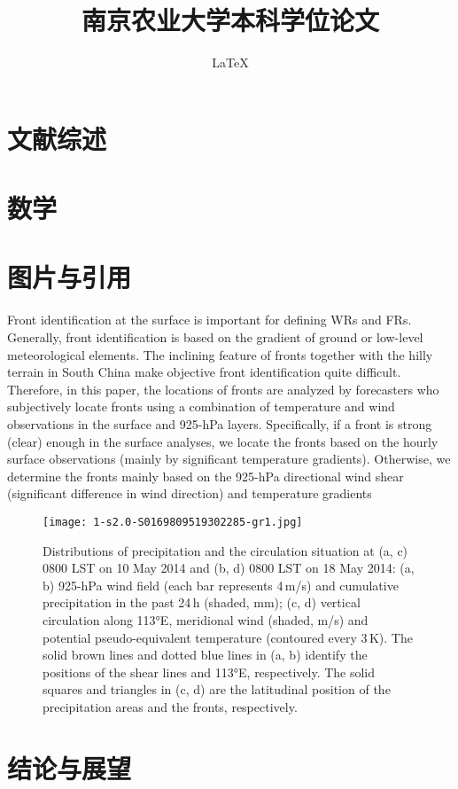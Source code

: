 \documentclass{thesis}
\title{南京农业大学本科学位论文}
{ \LaTeX 模板示例文档}{A Sample Document for \LaTeX-based NJAU Thesis Template}
\author{ \LaTeX }
\begin{document}
\makecover

\copyrightpage



\tableofcontents

\mainpart

\section{文献综述}


\section{数学}


\section{图片与引用}
Front identification at the surface is important for defining WRs and
FRs. Generally, front identification is based on the gradient of ground or
low-level meteorological elements. The inclining feature of fronts together with the hilly terrain in South China make objective front
identification quite difficult. Therefore, in this paper, the locations of
fronts are analyzed by forecasters who subjectively locate fronts using a
combination of temperature and wind observations in the surface and
925-hPa layers. Specifically, if a front is strong (clear) enough in the
surface analyses, we locate the fronts based on the hourly surface observations (mainly by significant temperature gradients). Otherwise, we
determine the fronts mainly based on the 925-hPa directional wind
shear (significant difference in wind direction) and temperature gradients\cite{WU2020104693}
\begin{figure}[htbp]
	\centering
	\texttt{[image: 1-s2.0-S0169809519302285-gr1.jpg]}
	\caption{Distributions of precipitation and the circulation situation at (a, c) 0800 LST on 10 May 2014 and (b, d) 0800 LST on 18 May 2014: (a, b) 925-hPa wind field (each bar represents 4 m/s) and cumulative precipitation in the past 24 h (shaded, mm); (c, d) vertical circulation along 113°E, meridional wind (shaded, m/s) and potential pseudo-equivalent temperature (contoured every 3 K). The solid brown lines and dotted blue lines in (a, b) identify the positions of the shear lines and 113°E, respectively. The solid squares and triangles in (c, d) are the latitudinal position of the precipitation areas and the fronts, respectively.}
    \label{fig:1}
\end{figure}

\section{结论与展望}


\acknowledgement


\thesisreferences
\end{document}
